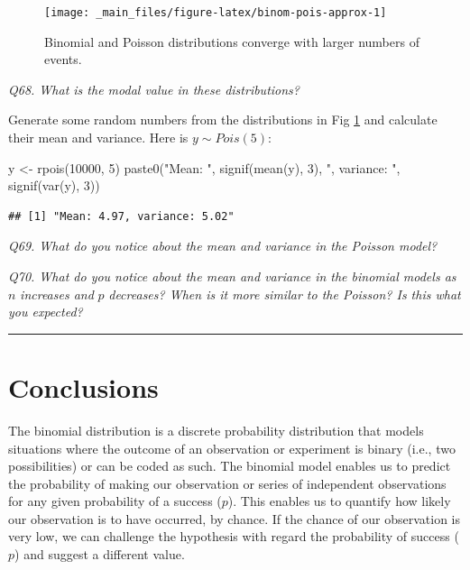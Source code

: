 \documentclass[
  11pt,
  a4paper,
]{book}
\newenvironment{Shaded}{\begin{snugshade}}{\end{snugshade}}
\newcommand{\DecValTok}[1]{\textcolor[rgb]{0.00,0.00,0.81}{#1}}
\newcommand{\FunctionTok}[1]{\textcolor[rgb]{0.00,0.00,0.00}{#1}}
\newcommand{\NormalTok}[1]{#1}
\newcommand{\OtherTok}[1]{\textcolor[rgb]{0.56,0.35,0.01}{#1}}
\newcommand{\StringTok}[1]{\textcolor[rgb]{0.31,0.60,0.02}{#1}}
\begin{document}
\begin{figure}

{\centering \texttt{[image: \_main\_files/figure-latex/binom-pois-approx-1]} 

}

\caption{Binomial and Poisson distributions converge with larger numbers of events.}\label{fig:binom-pois-approx}
\end{figure}

\emph{Q68. What is the modal value in these distributions?}

Generate some random numbers from the distributions in Fig \ref{fig:binom-pois-approx} and calculate their mean and variance. Here is \(y \sim Pois(5)\):

\begin{Shaded}
\begin{Highlighting}[]
\NormalTok{y }\OtherTok{\textless{}{-}} \FunctionTok{rpois}\NormalTok{(}\DecValTok{10000}\NormalTok{, }\DecValTok{5}\NormalTok{)}
\FunctionTok{paste0}\NormalTok{(}\StringTok{"Mean: "}\NormalTok{, }\FunctionTok{signif}\NormalTok{(}\FunctionTok{mean}\NormalTok{(y), }\DecValTok{3}\NormalTok{), }\StringTok{", variance: "}\NormalTok{, }\FunctionTok{signif}\NormalTok{(}\FunctionTok{var}\NormalTok{(y), }\DecValTok{3}\NormalTok{))}
\end{Highlighting}
\end{Shaded}

\begin{verbatim}
## [1] "Mean: 4.97, variance: 5.02"
\end{verbatim}

\emph{Q69. What do you notice about the mean and variance in the Poisson model?}

\emph{Q70. What do you notice about the mean and variance in the binomial models as} \(n\) \emph{increases and} \(p\) \emph{decreases? When is it more similar to the Poisson? Is this what you expected?}

\begin{center}\rule{0.5\linewidth}{0.5pt}\end{center}

\hypertarget{conclusions-1}{%
\section{Conclusions}\label{conclusions-1}}

The binomial distribution is a discrete probability distribution that models situations where the outcome of an observation or experiment is binary (i.e., two possibilities) or can be coded as such. The binomial model enables us to predict the probability of making our observation or series of independent observations for any given probability of a success (\(p\)). This enables us to quantify how likely our observation is to have occurred, by chance. If the chance of our observation is very low, we can challenge the hypothesis with regard the probability of success (\(p\)) and suggest a different value.
\end{document}
